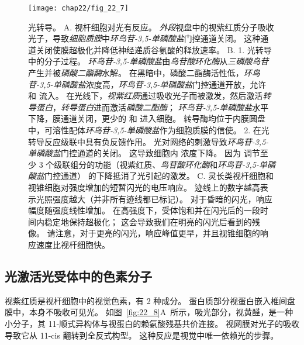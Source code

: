 \begin{figure}[htbp]
	\centering
	\texttt{[image: chap22/fig\_22\_7]}
	\caption{光转导。
		A. 视杆细胞对光有反应。
		\textit{外段}视盘中的视紫红质分子吸收光子，导致\textit{细胞质膜}中\textit{环鸟苷-3,5-单磷酸盐}门控通道关闭。
		这种通道关闭使膜超极化并降低神经递质谷氨酸的释放速率\cite{alberts2017molecular}。
		B. 1. 光转导中的分子过程。
		\textit{环鸟苷-3,5-单磷酸盐}由\textit{鸟苷酸环化酶}从\textit{三磷酸鸟苷}产生并被\textit{磷酸二酯酶}水解。
		在黑暗中，磷酸二酯酶活性低，\textit{环鸟苷-3,5-单磷酸盐}浓度高，\textit{环鸟苷-3,5-单磷酸盐}门控通道开放，允许  和  流入。
		在光线下，\textit{视紫红质}通过吸收光子而被激发，然后激活\textit{转导蛋白}，\textit{转导蛋白}进而激活\textit{磷酸二酯酶}；
		\textit{环鸟苷-3,5-单磷酸盐}水平下降，膜通道关闭，更少的  和  进入细胞。
		转导酶均位于内膜圆盘中，可溶性配体\textit{环鸟苷-3,5-单磷酸盐}作为细胞质膜的信使。
		2.  在光转导反应级联中具有负反馈作用。
		光对网络的刺激导致\textit{环鸟苷-3,5-单磷酸盐}门控通道的关闭。
		这导致细胞内  浓度下降。
		因为  调节至少 3 个级联组分的功能（视紫红质、\textit{鸟苷酸环化酶}和\textit{环鸟苷-3,5-单磷酸盐}门控通道） 的下降抵消了光引起的激发。
		C. 灵长类视杆细胞和视锥细胞对强度增加的短暂闪光的电压响应。
		迹线上的数字越高表示光照强度越大（并非所有迹线都已标记）。 
		对于昏暗的闪光，响应幅度随强度线性增加。 
		在高强度下，受体饱和并在闪光后的一段时间内稳定地保持超极化；
		这会导致我们在明亮的闪光后看到的残像。 
		请注意，对于更亮的闪光，响应峰值更早，并且视锥细胞的响应速度比视杆细胞快\cite{schneeweis1995photovoltage}。}
	\label{fig:22_7}
\end{figure}



\subsection{光激活光受体中的色素分子}

视紫红质是视杆细胞中的视觉色素，有 2 种成分。
蛋白质部分视蛋白嵌入椎间盘膜中，本身不吸收可见光。 
如图~\ref{fig:22_8}A~所示，吸光部分，视黄醛，是一种小分子，其 11-顺式异构体与视蛋白的赖氨酸残基共价连接。
视网膜对光子的吸收导致它从 11-cis 翻转到全反式构型。
这种反应是视觉中唯一依赖光的步骤。


